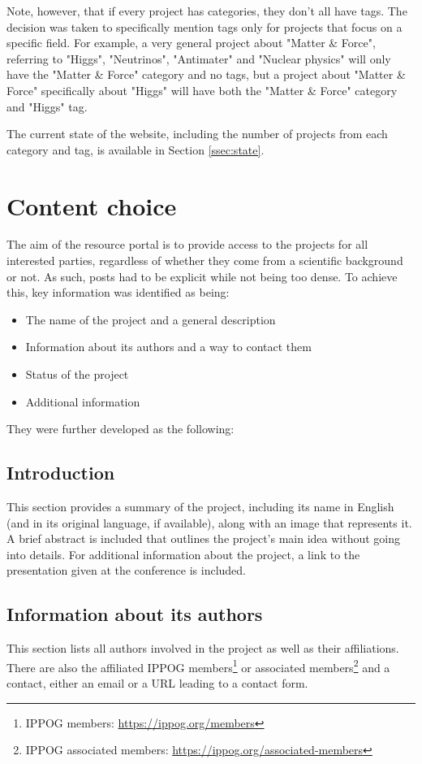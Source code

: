 Note, however, that if every project has categories, they don't all have tags. The decision was taken to specifically mention tags only for projects that focus on a specific field. For example, a very general project about "Matter \& Force", referring to "Higgs", "Neutrinos", "Antimater" and "Nuclear physics" will only have the "Matter \& Force" category and no tags, but a project about "Matter \& Force" specifically about "Higgs" will have both the "Matter \& Force" category and "Higgs" tag.

The current state of the website, including the number of projects from each category and tag, is available in Section \ref{ssec:state}.

\section{Content choice}\label{ssec:content}

The aim of the resource portal is to provide access to the projects for all interested parties, regardless of whether they come from a scientific background or not. As such, posts had to be explicit while not being too dense. To achieve this, key information was identified as being:
\begin{itemize}
    \item The name of the project and a general description
    \item Information about its authors and a way to contact them
    \item Status of the project
    \item Additional information
\end{itemize}

They were further developed as the following:

\subsection*{Introduction}
This section provides a summary of the project, including its name in English (and in its original language, if available), along with an image that represents it. A brief abstract is included that outlines the project's main idea without going into details. For additional information about the project, a link to the presentation given at the conference is included.

\subsection*{Information about its authors}
This section lists all authors involved in the project as well as their affiliations. There are also the affiliated IPPOG members\footnote{IPPOG members: \href{https://ippog.org/members}{https://ippog.org/members}} or associated members\footnote{IPPOG associated members: \href{https://ippog.org/associated-members}{https://ippog.org/associated-members}} and a contact, either an email or a URL leading to a contact form.

